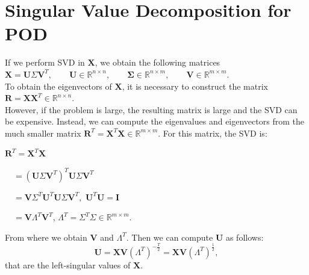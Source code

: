 \documentclass[review]{elsarticle}
\begin{document}
\section{Singular Value Decomposition for POD}\label{a3}
If we perform SVD in $\mathbf{X}$, we obtain the following matrices \\
$\mathbf{X}=\mathbf{U}\Sigma \mathbf{V}^T, \qquad \mathbf{U}\in\mathbb{R}^{n \times n},\qquad \mathbf{\Sigma}\in\mathbb{R}^{n \times m}, \qquad \mathbf{V}\in\mathbb{R}^{m \times m}.$\\
To obtain the eigenvectors of $\mathbf{X}$, it is necessary to construct the matrix $\mathbf{R}= \mathbf{X}\mathbf{X}^T\in\mathbb{R}^{n \times n}$.\\ However, if the problem is large, the resulting matrix is large and the SVD can be expensive. Instead, we can compute the eigenvalues and eigenvectors from the much smaller matrix $\mathbf{R}^T= \mathbf{X}^T\mathbf{X}\in\mathbb{R}^{m \times m}$. For this matrix, the SVD is:
\begin{itemize}
\begin{minipage}{.4\textwidth}
\item[] $\mathbf{R}^T= \mathbf{X}^T\mathbf{X}$
 \item[] $\quad=(\mathbf{U}\Sigma \mathbf{V}^T)^T\mathbf{U}\Sigma \mathbf{V}^T$
 \item[] $\quad=\mathbf{V}\Sigma ^T\mathbf{U}^T\mathbf{U}\Sigma \mathbf{V}^T,$ $\mathbf{U}^T\mathbf{U}=\mathbf{I}$ 
  \item[] $\quad=\mathbf{V}\Lambda^T \mathbf{V}^T$, 
  $\Lambda^T=\Sigma ^T\Sigma \in\mathbb{R}^{m \times m}.$
\end{minipage}
\end{itemize}
From where we obtain $\mathbf{V}$ and $\Lambda^T$. Then we can compute $\mathbf{U}$ as follows:
$$\mathbf{U}=\mathbf{X}\mathbf{V}(\Lambda^T)^{-\frac{T}{2}}=\mathbf{X}\mathbf{V}(\Lambda^T)^{\frac{1}{2}},$$
that are the left-singular values of $\mathbf{X}.$
\end{document}
